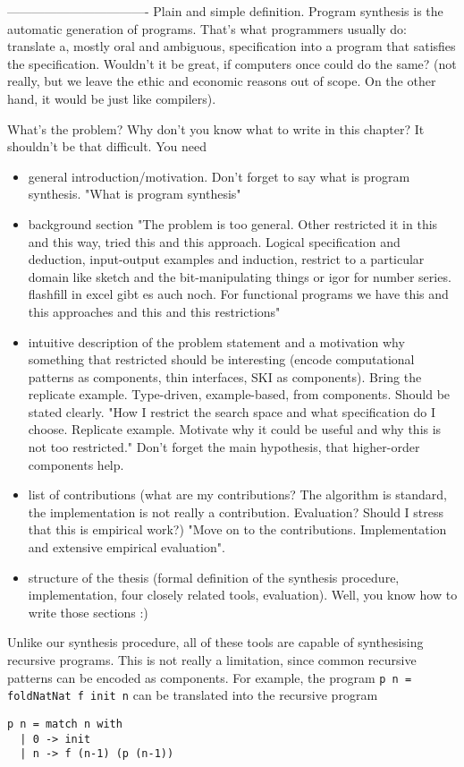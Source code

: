 ----------------------------------
Plain and simple definition. Program synthesis is the automatic generation of programs. That's what programmers usually do: translate a, mostly oral and ambiguous, specification into a program that satisfies the specification. Wouldn't it be great, if computers once could do the same? (not really, but we leave the ethic and economic reasons out of scope. On the other hand, it would be just like compilers).

What's the problem? Why don't you know what to write in this chapter? It shouldn't be that difficult. You need
\begin{itemize}
\item general introduction/motivation. Don't forget to say what is program synthesis. "What is program synthesis"
\item background section "The problem is too general. Other restricted it in this and this way, tried this and this approach. Logical specification and deduction, input-output examples and induction, restrict to a particular domain like sketch and the bit-manipulating things or igor for number series. flashfill in excel gibt es auch noch. For functional programs we have this and this approaches and this and this restrictions"
\item intuitive description of the problem statement and a motivation why something that restricted should be interesting (encode computational patterns as components, thin interfaces, SKI as components). Bring the replicate example. Type-driven, example-based, from components. Should be stated clearly. "How I restrict the search space and what specification do I choose. Replicate example. Motivate why it could be useful and why this is not too restricted." Don't forget the main hypothesis, that higher-order components help.
\item list of contributions (what are my contributions? The algorithm is standard, the implementation is not really a contribution. Evaluation? Should I stress that this is empirical work?) "Move on to the contributions. Implementation and extensive empirical evaluation".
\item structure of the thesis (formal definition of the synthesis procedure, implementation, four closely related tools, evaluation). Well, you know how to write those sections :)
\end{itemize} 


Unlike our synthesis procedure, all of these tools are capable of synthesising recursive programs. This is not really a limitation, since common recursive patterns can be encoded as components. For example, the program \lstinline!p n = foldNatNat f init n! can be translated into the recursive program
\begin{lstlisting}[style=plain]
p n = match n with
  | 0 -> init
  | n -> f (n-1) (p (n-1))
\end{lstlisting}  


